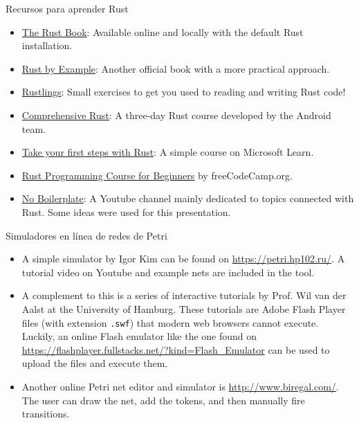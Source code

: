 \documentclass{beamer}
\begin{document}
\begin{frame}{Recursos para aprender Rust}
  \begin{itemize}
    \item \href{https://doc.rust-lang.org/stable/book/}{The Rust Book}:
          Available online and locally with the default Rust installation.
    \item \href{https://doc.rust-lang.org/rust-by-example/}{Rust by Example}:
          Another official book with a more practical approach.
    \item \href{https://github.com/rust-lang/rustlings}{Rustlings}:
          Small exercises to get you used to reading and writing Rust code!
    \item \href{https://google.github.io/comprehensive-rust/}{Comprehensive Rust}:
          A three-day Rust course developed by the Android team.
    \item \href{https://learn.microsoft.com/en-us/training/paths/rust-first-steps/}{Take your first steps with Rust}:
          A simple course on Microsoft Learn.
    \item \href{https://www.youtube.com/watch?v=MsocPEZBd-M}{Rust Programming Course for Beginners} by freeCodeCamp.org.
    \item \href{https://www.youtube.com/\@NoBoilerplate/videos}{No Boilerplate}:
          A Youtube channel mainly dedicated to topics connected with Rust. Some ideas were used for this presentation.
  \end{itemize}
\end{frame}

\begin{frame}{Simuladores en línea de redes de Petri}
  \begin{itemize}
    \item A simple simulator by Igor Kim can be found on \url{https://petri.hp102.ru/}.
          A tutorial video on Youtube and example nets are included in the tool.
    \item A complement to this is a series of interactive tutorials by Prof. Wil van der Aalst
          at the University of Hamburg. These tutorials are Adobe Flash Player files (with extension \texttt{.swf})
          that modern web browsers cannot execute.
          Luckily, an online Flash emulator like the one found on \url{https://flashplayer.fullstacks.net/?kind=Flash_Emulator}
          can be used to upload the files and execute them.
    \item Another online Petri net editor and simulator is \url{http://www.biregal.com/}.
          The user can draw the net, add the tokens, and then manually fire transitions.
  \end{itemize}
\end{frame}
\end{document}

